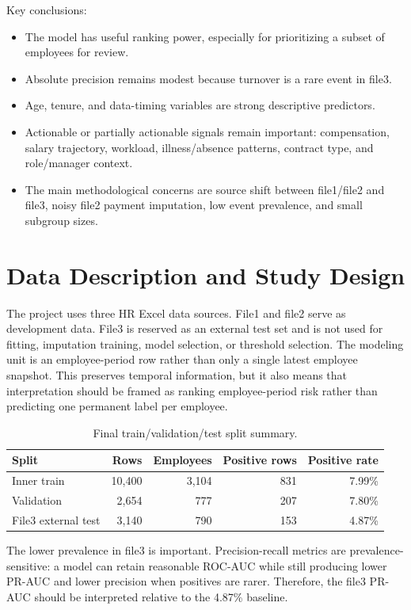 \documentclass[11pt]{article}
\begin{document}
Key conclusions:
\begin{itemize}
    \item The model has useful ranking power, especially for prioritizing a subset of employees for review.
    \item Absolute precision remains modest because turnover is a rare event in file3.
    \item Age, tenure, and data-timing variables are strong descriptive predictors.
    \item Actionable or partially actionable signals remain important: compensation, salary trajectory, workload, illness/absence patterns, contract type, and role/manager context.
    \item The main methodological concerns are source shift between file1/file2 and file3, noisy file2 payment imputation, low event prevalence, and small subgroup sizes.
\end{itemize}

\section{Data Description and Study Design}

The project uses three HR Excel data sources. File1 and file2 serve as development data. File3 is reserved as an external test set and is not used for fitting, imputation training, model selection, or threshold selection. The modeling unit is an employee-period row rather than only a single latest employee snapshot. This preserves temporal information, but it also means that interpretation should be framed as ranking employee-period risk rather than predicting one permanent label per employee.

\begin{table}[H]
\centering
\caption{Final train/validation/test split summary.}
\begin{tabular}{lrrrr}
\toprule
Split & Rows & Employees & Positive rows & Positive rate \\
\midrule
Inner train & 10,400 & 3,104 & 831 & 7.99\% \\
Validation & 2,654 & 777 & 207 & 7.80\% \\
File3 external test & 3,140 & 790 & 153 & 4.87\% \\
\bottomrule
\end{tabular}
\end{table}

The lower prevalence in file3 is important. Precision-recall metrics are prevalence-sensitive: a model can retain reasonable ROC-AUC while still producing lower PR-AUC and lower precision when positives are rarer. Therefore, the file3 PR-AUC should be interpreted relative to the 4.87\% baseline.
\end{document}
